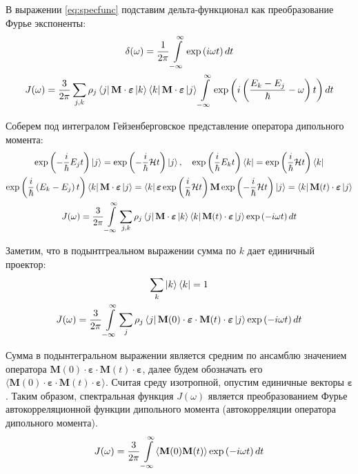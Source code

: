 \documentclass[12pt]{article}
\newcommand{\lb}{\left(}
\newcommand{\rb}{\right)}
\newcommand{\mH}{\mathcal{H}}
\newcommand{\mf}{\mathbf}
\newcommand{\vverh}{\vspace*{-0.15cm}}
\begin{document}
В выражении \eqref{eq:specfunc} подставим дельта-функционал как преобразование Фурье экспоненты: 
\vverh
\begin{gather}
	\delta(\omega) = \frac{1}{2 \pi} \int\limits_{-\infty}^{\infty} \exp \lb i \omega t \rb dt \notag \\
	J(\omega) = \frac{3}{2 \pi} \sum_{j, k} \rho_j \bra{j} \mf{M} \cdot \boldsymbol{\varepsilon} \ket{k} \bra{k} \mf{M} \cdot \boldsymbol{\varepsilon} \ket{j} \int\limits_{-\infty}^{\infty} \exp \lb i \lb \frac{E_k - E_j}{\hbar} - \omega \rb t \rb dt \notag
\end{gather}

Соберем под интегралом Гейзенберговское представление оператора дипольного момента:
\vverh
\begin{gather}
	\exp \lb - \frac{i}{\hbar} E_j t \rb \ket{j} = \exp \lb - \frac{i}{\hbar} \mH t \rb \ket{j}, \quad \exp \lb \frac{i}{\hbar} E_k t \rb \bra{k} = \exp \lb \frac{i}{\hbar} \mH t \rb \bra{k} \notag \\
	\exp \lb \frac{i}{\hbar} \lb E_k - E_j \rb t \rb \bra{k} \mf{M} \cdot \boldsymbol{\varepsilon} \ket{j} = \bra{k} \boldsymbol{\varepsilon} \exp \lb \frac{i}{\hbar} \mH t \rb \mf{M} \exp \lb - \frac{i}{\hbar} \mH t \rb \ket{j} = \bra{k} \mf{M}(t) \cdot \boldsymbol{\varepsilon} \ket{j} \notag \\
	J(\omega) = \frac{3}{2 \pi} \int\limits_{-\infty}^{\infty} \sum_{j, k} \rho_j \bra{j} \mf{M} \cdot \boldsymbol{\varepsilon} \ket{k} \bra{k} \mf{M}(t) \cdot \boldsymbol{\varepsilon} \ket{j} \exp \lb - i \omega t \rb dt \label{eq:specfunc2} 
\end{gather}

Заметим, что в подынтгреальном выражении сумма по $k$ дает единичный проектор:
\begin{gather}
	\sum_k \ket{k} \bra{k} = 1 \notag \\
	J(\omega) = \frac{3}{2 \pi} \int\limits_{-\infty}^{\infty} \sum_j \rho_j \bra{j}  \mf{M}(0) \cdot \boldsymbol{\varepsilon} \cdot \mf{M}(t) \cdot \boldsymbol{\varepsilon} \ket{j} \exp \lb - i \omega t \rb dt \notag
\end{gather}

Сумма в подынтегральном выражении является средним по ансамблю значением оператора $\mf{M}(0) \cdot \boldsymbol{\varepsilon} \cdot \mf{M}(t) \cdot \boldsymbol{\varepsilon}$, далее будем обозначать его $\langle \mf{M}(0) \cdot \boldsymbol{\varepsilon} \cdot \mf{M}(t) \cdot \boldsymbol{\varepsilon} \rangle$. Считая среду изотропной, опустим единичные векторы $\boldsymbol{\varepsilon}$. Таким образом, спектральная функция $J(\omega)$ является преобразованием Фурье автокорреляционной функции дипольного момента (автокорреляции оператора дипольного момента). 
\vverh
\begin{gather}
	J(\omega) = \frac{3}{2 \pi} \int\limits_{-\infty}^{\infty} \langle \mf{M}(0) \mf{M}(t) \rangle \exp \lb - i \omega t \rb dt \notag
\end{gather}
\end{document}

